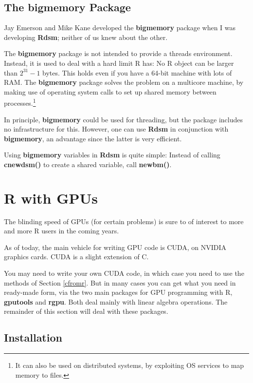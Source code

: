 \subsection{The bigmemory Package}
\label{bigmemory}

Jay Emerson and Mike Kane developed the {\bf bigmemory} package when I
was developing {\bf Rdsm}; neither of us knew about the other.

The {\bf bigmemory} package is not intended to provide a threads
environment.  Instead, it is used to deal with a hard limit R has:
No R object can be larger than $2^{31}-1$ bytes.  This holds even if you
have a 64-bit machine with lots of RAM.  The {\bf bigmemory} package
solves the problem on a multicore machine, by making use of operating
system calls to set up shared memory between processes.\footnote{It can
also be used on distributed systems, by exploiting OS services to map
memory to files.}  

In principle, {\bf bigmemory} could be used for threading, but the
package includes no infrastructure for this.  However, one can use {\bf
Rdsm} in conjunction with {\bf bigmemory}, an advantage since the latter
is very efficient.  

Using {\bf bigmemory} variables in {\bf Rdsm} is quite simple:  Instead
of calling {\bf cnewdsm()} to create a shared variable, call {\bf newbm()}.

\section{R with GPUs}

The blinding speed of GPUs (for certain problems) is sure to of interest
to more and more R users in the coming years.  

As of today, the main vehicle for writing GPU code is CUDA, on NVIDIA
graphics cards.  CUDA is a slight extension of C.

You may need to write your own CUDA code, in which case you need to use
the methods of Section \ref{cfromr}.  But in many cases you can get what
you need in ready-made form, via the two main packages for GPU programming
with R, {\bf gputools} and {\bf rgpu}.  Both deal mainly with linear
algebra operations.  The remainder of this section will deal with these
packages.

\subsection{Installation}
\label{gpuinstall}

